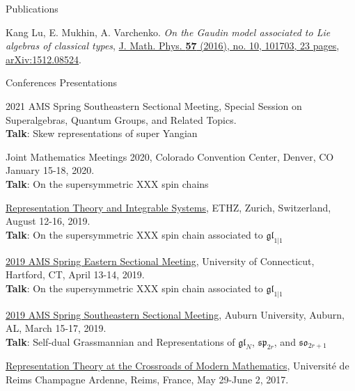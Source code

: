 \documentclass{resume} %
\begin{document}
\begin{rSection}{Publications}
\begin{etaremune}[leftmargin=0cm]
\item Kang Lu, E. Mukhin, A. Varchenko. 
{\it On the Gaudin model associated to Lie algebras of classical types}, \href{https://doi.org/10.1063/1.4964389}{J. Math. Phys. {\bf 57} (2016), no. 10, 101703, 23 pages}, \href{https://arxiv.org/abs/1512.08524}{arXiv:1512.08524}.
\end{etaremune}
\end{rSection}

\begin{rSection}{Conferences Presentations}
\begin{rSubsection}{}{}
{}{}
  \item {2021 AMS Spring Southeastern Sectional Meeting, Special Session on Superalgebras, Quantum Groups, and Related Topics.\\
      \textbf{Talk}: Skew representations of super Yangian}\\
  \item {Joint Mathematics Meetings 2020, Colorado Convention Center, Denver, CO January 15-18, 2020.\\
        \textbf{Talk}: On the supersymmetric XXX spin chains}\\
  \item {\href{http://rtis2019.math.iupui.edu/}{Representation Theory and Integrable Systems}, ETHZ, Zurich, Switzerland, August 12-16, 2019. \\
		{\bf Talk}: On the supersymmetric XXX spin chain associated to $\mathfrak{gl}_{1|1}$}\\
  \item {\href{http://www.ams.org/meetings/sectional/2265_program.html}{2019 AMS Spring Eastern Sectional Meeting}, University of Connecticut, Hartford, CT, April 13-14, 2019. \\
        {\bf Talk}: On the supersymmetric XXX spin chain associated to $\mathfrak{gl}_{1|1}$}\\
  \item {\href{http://www.ams.org/meetings/sectional/2261_program.html}{2019 AMS Spring Southeastern Sectional Meeting}, Auburn University, Auburn, AL, March 15-17, 2019. \\
        {\bf Talk}: Self-dual Grassmannian and Representations of $\mathfrak{gl}_N$, $\mathfrak{sp}_{2r}$, and $\mathfrak{so}_{2r+1}$}\\
  \item {\href{http://reims.math.cnrs.fr/pevzner/aak81.html}{Representation Theory at the Crossroads of Modern Mathematics}, Universit\'{e} de Reims Champagne Ardenne, Reims, France, May 29-June 2, 2017. \\
}
\end{rSubsection}
\end{rSection}
\end{document}
